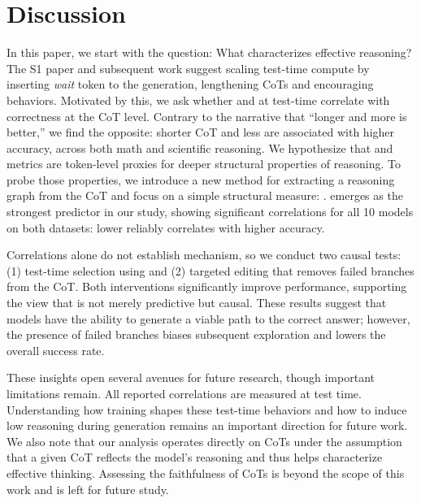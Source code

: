 


\section{Discussion}

In this paper, we start with the question: What characterizes effective reasoning? The S1 paper and subsequent work \citep{muennighoff2025s1, ringel2025learning, jurayj2025your} suggest scaling test-time compute by inserting \textit{wait} token to the generation, lengthening CoTs and encouraging \Review behaviors. Motivated by this, we ask whether \Length and \Review at test-time correlate with correctness at the CoT level. Contrary to the narrative that “longer and more \Review is better,” we find the opposite: shorter CoT and less \rr are associated with higher accuracy, across both math and scientific reasoning. We hypothesize that \Length and \rr metrics are token-level proxies for deeper structural properties of reasoning. To probe those properties, we introduce a new method for extracting a reasoning graph from the CoT and focus on a simple structural measure: \failedstep. \fsf emerges as the strongest predictor in our study, showing significant correlations for all 10 models on both datasets: lower \fsf reliably correlates with higher accuracy.

Correlations alone do not establish mechanism, so we conduct two causal tests: (1) test-time selection using \fsf and (2) targeted editing that removes failed branches from the CoT. Both interventions significantly improve performance, supporting the view that \fsf is not merely predictive but causal. These results suggest that models have the ability to generate a viable path to the correct answer; however, the presence of failed branches biases subsequent exploration and lowers the overall success rate. 


These insights open several avenues for future research, though important limitations remain. All reported correlations are measured at test time. Understanding how training shapes these test-time behaviors and how to induce low \fsf reasoning during generation remains an important direction for future work. We also note that our analysis operates directly on CoTs under the assumption that a given CoT reflects the model’s reasoning and thus helps characterize effective thinking. Assessing the faithfulness of CoTs \citep{lanham2023measuring, chen2025reasoning} is beyond the scope of this work and is left for future study.
